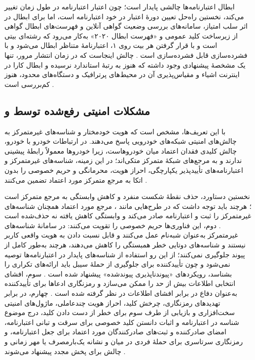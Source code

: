 ابطال اعتبارنامه‌ها چالشی پایدار است؛ چون اعتبار اعتبارنامه در طول زمان تغییر می‌کند، نخستین راه‌حل تعیین دورهٔ اعتبار در خود اعتبارنامه است، اما برای ابطال در اثر سلب امتیاز، سامانه‌های بررسی وضعیت گواهی آنلاین و فهرست‌های ابطال گواهی از زیرساخت کلید عمومی و «فهرست ابطال ۲۰۲۰»  به‌کار می‌رود که رشته‌ای بیتی است و با قرار گرفتن هر بیت روی ۱، اعتبارنامهٔ متناظر ابطال می‌شود و با فشرده‌سازی  قابل فشرده‌سازی است \cite{mazzocca2025survey}. چالش اینجاست که در زمان انتشار مرور، تنها یک مشخصهٔ پیشنهادی وجود داشته که هنوز به رتبهٔ استاندارد  نرسیده و ابطال کارا در اینترنت اشیاء و مقیاس‌پذیری آن در محیط‌های پرترافیک و دستگاه‌های محدود، هنوز کم‌بررسی است \cite{mazzocca2025survey}.

\subsection{مشکلات امنیتی رفع‌شده توسط  و }

با این تعریف‌ها، مشخص است که هویت خودمختار و شناسه‌های غیرمتمرکز به چالش‌های امنیتی شبکه‌های خودرویی پاسخ می‌دهند. در ارتباطات خودرو با خودرو، چالش کلیدی فقدان اعتماد میان خودروهاست، زیرا خودروها معمولاً رابطهٔ پیشینی ندارند و به مرجع‌های شبکهٔ متمرکز متکی‌اند؛ در این زمینه، شناسه‌های غیرمتمرکز و اعتبارنامه‌های تأییدپذیر یکپارچگی، احراز هویت، محرمانگی و حریم خصوصی را بدون اتکا به مرجع متمرکز مورد اعتماد تضمین می‌کنند \cite{mazzocca2025survey}.

نخستین دستاورد، حذف نقطهٔ شکست منفرد و کاهش وابستگی به مرجع متمرکز است \cite{mazzocca2025survey}؛ هرچند باید توجه داشت که در طرح‌هایی مانند ، مرجع مورد اعتماد همچنان شناسه‌های غیرمتمرکز را ثبت و اعتبارنامه صادر می‌کند و وابستگی کاهش یافته نه حذف‌شده است \cite{feraudoDIVADIDbasedReputation2024}. دوم، این فناوری‌ها حریم خصوصی را تقویت می‌کنند: در سامانهٔ  شناسه‌های غیرمتمرکز به‌عنوان شبه‌نام عمل می‌کنند و قابل نسبت دادن به هویت واقعی کاربر نیستند \cite{feraudoDIVADIDbasedReputation2024} و شناسه‌های دوتایی خطر همبستگی را کاهش می‌دهند، هرچند به‌طور کامل از پیوند جلوگیری نمی‌کنند؛ از این رو استفاده از شناسه‌های پایدار در اعتبارنامه‌ها توصیه نمی‌شود و چون تأییدکننده برای جلوگیری از حملهٔ سیبل باید ارائه‌های تکراری را بشناسد، رویکردهای «پیوندناپذیری پیوندشده» پیشنهاد شده است \cite{mazzocca2025survey}. سوم، افشای انتخابی اطلاعات بیش از حد را ممکن می‌سازد و رمزنگاری ادعاها برای تأییدکننده به‌عنوان دفاع در برابر افشای اطلاعات در نظر گرفته شده است \cite{mazzocca2025survey}. چهارم، در برابر تهدیدهای رمزنگاری، چرخش کلید، احراز هویت چندعاملی، ماژول‌های امنیتی سخت‌افزاری و بازیابی از طرف سوم برای خطر از دست دادن کلید، درج موضوع شناسه در اعتبارنامه و اثبات دانستن کلید خصوصی برای سرقت و تبانی اعتبارنامه، امضای صادرکننده و ثبت‌های صادرکنندگان مورد اعتماد برای جعل اعتبارنامه، و رمزنگاری سرتاسری برای حملهٔ فردی در میان و نشانه یک‌بارمصرف یا مهر زمانی و چالش برای پخش مجدد پیشنهاد می‌شوند \cite{mazzocca2025survey}.

